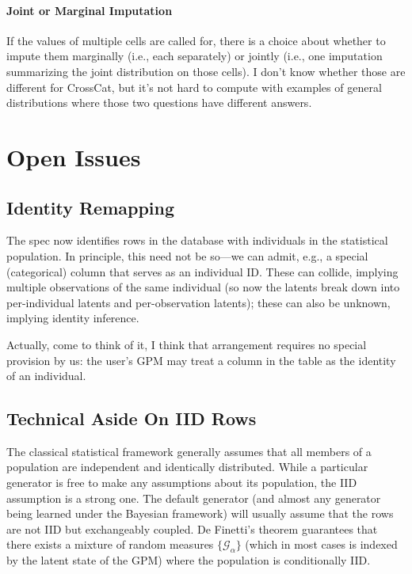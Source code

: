\documentclass[10pt,letterpaper]{article}
\newcommand{\set}[1]{\{#1\}}
\newcommand{\G}{\mathcal{G}}
\begin{document}
\paragraph{Joint or Marginal Imputation}
If the values of multiple cells are called for, there is a choice
about whether to impute them marginally (i.e., each separately) or
jointly (i.e., one imputation summarizing the joint distribution on
those cells).  I don't know whether those are different for CrossCat,
but it's not hard to compute with examples of general distributions
where those two questions have different answers.

\section{Open Issues}

\subsection{Identity Remapping}

The spec now identifies rows in the database with individuals in
the statistical population.  In principle, this need not be so---we can admit, e.g.,
a special (categorical) column that serves as an individual ID.  These can collide,
implying multiple observations of the same individual (so now the latents break
down into per-individual latents and per-observation latents); these can also be unknown,
implying identity inference.

Actually, come to think of it, I think that arrangement requires no
special provision by us: the user's GPM may treat a column in the
table as the identity of an individual.


\subsection{Technical Aside On IID Rows}


The classical statistical framework generally assumes that all members of a
population are independent and identically
distributed.   While a particular
generator is free to make any assumptions about its population, the IID
assumption is a strong one. The default generator (and almost any generator
being learned under the Bayesian framework) will usually assume that the rows
are not IID but exchangeably coupled. De Finetti's theorem guarantees that there
exists a mixture of random measures $\set{\G_\alpha}$ (which in most
cases is indexed by the latent state of the GPM) where the population is
conditionally IID.
\end{document}
